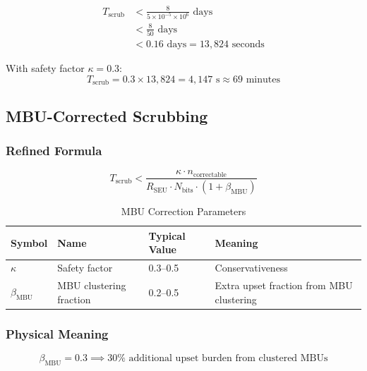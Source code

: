 \documentclass[11pt,a4paper]{article}
\begin{document}
\begin{align}
T_{\text{scrub}} &< \frac{8}{5 \times 10^{-5} \times 10^6} \text{ days} \\
&< \frac{8}{50} \text{ days} \\
&< 0.16 \text{ days} = 13{,}824 \text{ seconds}
\end{align}

With safety factor $\kappa = 0.3$:
\begin{equation}
T_{\text{scrub}} = 0.3 \times 13{,}824 = 4{,}147 \text{ s} \approx 69 \text{ minutes}
\end{equation}

\subsection{MBU-Corrected Scrubbing}

\subsubsection{Refined Formula}

\begin{equation}
T_{\text{scrub}} < \frac{\kappa \cdot n_{\text{correctable}}}{R_{\text{SEU}} \cdot N_{\text{bits}} \cdot (1 + \beta_{\text{MBU}})}
\end{equation}

\begin{table}[htbp]
\centering
\caption{MBU Correction Parameters}
\begin{tabular}{@{}llll@{}}
\toprule
\textbf{Symbol} & \textbf{Name} & \textbf{Typical Value} & \textbf{Meaning} \\ \midrule
$\kappa$ & Safety factor & 0.3--0.5 & Conservativeness \\
$\beta_{\text{MBU}}$ & MBU clustering fraction & 0.2--0.5 & Extra upset fraction from MBU clustering \\ \bottomrule
\end{tabular}
\end{table}

\subsubsection{Physical Meaning}

\begin{equation}
\beta_{\text{MBU}} = 0.3 \implies 30\% \text{ additional upset burden from clustered MBUs}
\end{equation}
\end{document}
